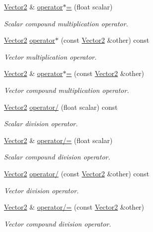 \begin{DoxyCompactItemize}
\hyperlink{classchaos_1_1gfx_1_1_vector2}{Vector2} \& \hyperlink{classchaos_1_1gfx_1_1_vector2_a7ec2f2358e64d1164652ad2f8acfc556}{operator$\ast$=} (float scalar)
\begin{DoxyCompactList}\small\item\em Scalar compound multiplication operator. \end{DoxyCompactList}\item 
\hyperlink{classchaos_1_1gfx_1_1_vector2}{Vector2} \hyperlink{classchaos_1_1gfx_1_1_vector2_ad490baee5933b993226a950220acf3f6}{operator$\ast$} (const \hyperlink{classchaos_1_1gfx_1_1_vector2}{Vector2} \&other) const 
\begin{DoxyCompactList}\small\item\em Vector multiplication operator. \end{DoxyCompactList}\item 
\hyperlink{classchaos_1_1gfx_1_1_vector2}{Vector2} \& \hyperlink{classchaos_1_1gfx_1_1_vector2_a1b7945cb00bf4f39c71747a041bae9ce}{operator$\ast$=} (const \hyperlink{classchaos_1_1gfx_1_1_vector2}{Vector2} \&other)
\begin{DoxyCompactList}\small\item\em Vector compound multiplication operator. \end{DoxyCompactList}\item 
\hyperlink{classchaos_1_1gfx_1_1_vector2}{Vector2} \hyperlink{classchaos_1_1gfx_1_1_vector2_a86fcd257dd859953cafffd69be1616f8}{operator/} (float scalar) const 
\begin{DoxyCompactList}\small\item\em Scalar division operator. \end{DoxyCompactList}\item 
\hyperlink{classchaos_1_1gfx_1_1_vector2}{Vector2} \& \hyperlink{classchaos_1_1gfx_1_1_vector2_abc4ba70fb8c781d02f97cce17f2ef31a}{operator/=} (float scalar)
\begin{DoxyCompactList}\small\item\em Scalar compound division operator. \end{DoxyCompactList}\item 
\hyperlink{classchaos_1_1gfx_1_1_vector2}{Vector2} \hyperlink{classchaos_1_1gfx_1_1_vector2_ab6e5e1b8277c502621deb1ac21befea1}{operator/} (const \hyperlink{classchaos_1_1gfx_1_1_vector2}{Vector2} \&other) const 
\begin{DoxyCompactList}\small\item\em Vector division operator. \end{DoxyCompactList}\item 
\hyperlink{classchaos_1_1gfx_1_1_vector2}{Vector2} \& \hyperlink{classchaos_1_1gfx_1_1_vector2_ad88acf6e87e1a19351ba000a69f570ae}{operator/=} (const \hyperlink{classchaos_1_1gfx_1_1_vector2}{Vector2} \&other)
\begin{DoxyCompactList}\small\item\em Vector compound division operator. \end{DoxyCompactList}\end{DoxyCompactItemize}
